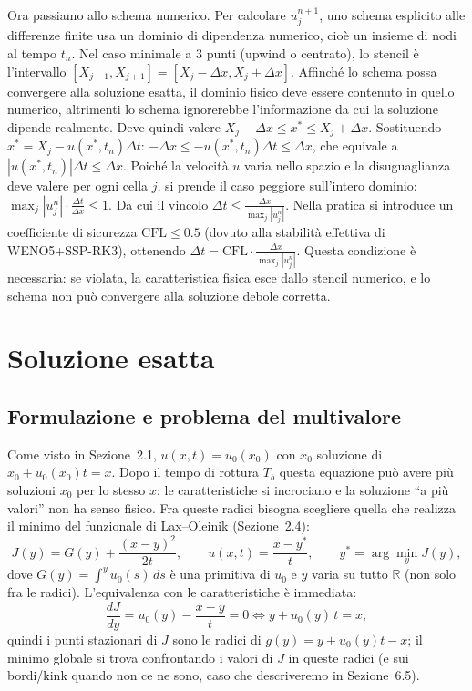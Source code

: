 \documentclass[12pt]{article}
\begin{document}
Ora passiamo allo schema numerico. Per calcolare \(u_j^{n+1}\), uno schema esplicito alle differenze finite usa un dominio di dipendenza numerico, cioè un insieme di nodi al tempo \(t_n\). Nel caso minimale a 3 punti (upwind o centrato), lo stencil è l'intervallo  
\([X_{j-1}, X_{j+1}]=[X_j-\Delta x, X_j+\Delta x]\).  
Affinché lo schema possa convergere alla soluzione esatta, il dominio fisico deve essere contenuto in quello numerico, altrimenti lo schema ignorerebbe l'informazione da cui la soluzione dipende realmente. Deve quindi valere  
\(X_j-\Delta x \le x^* \le X_j+\Delta x\).  
Sostituendo \(x^* = X_j - u(x^*, t_n)\Delta t\):  
\(-\Delta x \le -u(x^*, t_n)\Delta t \le \Delta x\),  
che equivale a  
\(|u(x^*, t_n)|\Delta t \le \Delta x\).  
Poiché la velocità \(u\) varia nello spazio e la disuguaglianza deve valere per ogni cella \(j\), si prende il caso peggiore sull'intero dominio:  
\(\max_j |u_j^n| \cdot \frac{\Delta t}{\Delta x} \le 1\).  
Da cui il vincolo  
\(\Delta t \le \frac{\Delta x}{\max_j |u_j^n|}\).  
Nella pratica si introduce un coefficiente di sicurezza \(\text{CFL} \le 0.5\) (dovuto alla stabilità effettiva di WENO5+SSP-RK3), ottenendo  
\(\Delta t = \text{CFL} \cdot \frac{\Delta x}{\max_j |u_j^n|}\).  
Questa condizione è necessaria: se violata, la caratteristica fisica esce dallo stencil numerico, e lo schema non può convergere alla soluzione debole corretta.
\newpage

\section{Soluzione esatta}

\subsection{Formulazione e problema del multivalore}

Come visto in Sezione~2.1, $u(x,t)=u_0(x_0)$ con $x_0$ soluzione di $x_0+u_0(x_0)t=x$. Dopo il tempo di rottura $T_b$ questa equazione può avere più soluzioni $x_0$ per lo stesso $x$: le caratteristiche si incrociano e la soluzione ``a più valori'' non ha senso fisico. Fra queste radici bisogna scegliere quella che realizza il minimo del funzionale di Lax--Oleinik (Sezione~2.4):
\[
J(y) = G(y) + \frac{(x-y)^2}{2t}, \qquad
u(x,t) = \frac{x-y^*}{t}, \qquad y^* = \arg\min_{y} J(y),
\]
dove $G(y)=\int^{y} u_0(s)\,ds$ è una primitiva di $u_0$ e $y$ varia su tutto $\mathbb{R}$ (non solo fra le radici). L'equivalenza con le caratteristiche è immediata:
\[
\frac{dJ}{dy} = u_0(y) - \frac{x-y}{t} = 0 \iff y+u_0(y)\,t = x,
\]
quindi i punti stazionari di $J$ sono le radici di $g(y)=y+u_0(y)t-x$; il minimo globale si trova confrontando i valori di $J$ in queste radici (e sui bordi/kink quando non ce ne sono, caso che descriveremo in Sezione~6.5).
\end{document}
